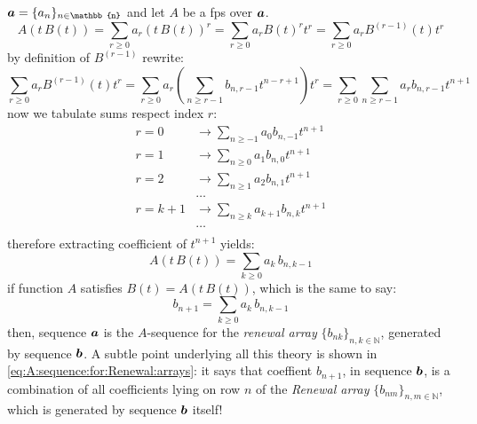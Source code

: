 $\vect{a}=\lbrace a_{n} \rbrace_{n\in\mathbb{n}}$ and let $A$ be
a \ac{fps} over $\boldsymbol{a}$.
\begin{displaymath}
    A\left(t\,B(t)\right) 
        = \sum_{r\geq 0}{a_{r}\left(t\,B(t)\right)^{r}}
        = \sum_{r\geq 0}{a_{r}B(t)^{r}t^{r}}
        = \sum_{r\geq 0}{a_{r}B^{(r-1)}(t)t^{r}}
\end{displaymath}
by definition of $B^{(r-1)}$ rewrite:
\begin{displaymath}
    \sum_{r\geq 0}{a_{r}B^{(r-1)}(t)t^{r}}
        =\sum_{r\geq 0}{a_{r}\left(\sum_{n\geq r-1}{b_{n,r-1}t^{n-r+1}}\right)t^{r}}
        =\sum_{r\geq 0}{\sum_{n\geq r-1}{a_{r}b_{n,r-1}t^{n+1}}}
\end{displaymath}
now we tabulate sums respect index $r$:
\begin{displaymath}
    \begin{split}
        r=0 &\rightarrow \sum_{n\geq -1}{a_{0}b_{n,-1}t^{n+1}}\\
        r=1 &\rightarrow \sum_{n\geq 0}{a_{1}b_{n,0}t^{n+1}}\\
        r=2 &\rightarrow \sum_{n\geq 1}{a_{2}b_{n,1}t^{n+1}}\\
        &\ldots\\
        r=k+1 &\rightarrow \sum_{n\geq k}{a_{k+1}b_{n,k}t^{n+1}}\\
        &\ldots\\
    \end{split}
\end{displaymath}
therefore extracting coefficient of $t^{n+1}$ yields:
\begin{displaymath}
    [t^{n+1}]A(t\,B(t))=\sum_{k\geq 0}{a_{k}\,b_{n,k-1}}
\end{displaymath}
if function $A$ satisfies 
$B(t)=A(t\,B(t))$, which is the same to say:
\begin{equation}
    b_{n+1}=\sum_{k\geq 0}{a_{k}\,b_{n,k-1}}
    \label{eq:A:sequence:for:Renewal:arrays}
\end{equation}
then, sequence $\boldsymbol{a}$ is the $A$-sequence for the \emph{renewal array}
$\lbrace b_{nk}\rbrace_{n,k\in\mathbb{N}}$, generated by sequence $\boldsymbol{b}$.
A subtle point underlying all this theory is shown in 
\autoref{eq:A:sequence:for:Renewal:arrays}: it says that coeffient
$b_{n+1}$, in sequence $\boldsymbol{b}$, is a combination
of all coefficients lying on row $n$ of the \emph{Renewal array}
$\lbrace b_{nm}\rbrace_{n,m\in\mathbb{N}}$,
which is generated by sequence $\boldsymbol{b}$ itself!
\\\\
